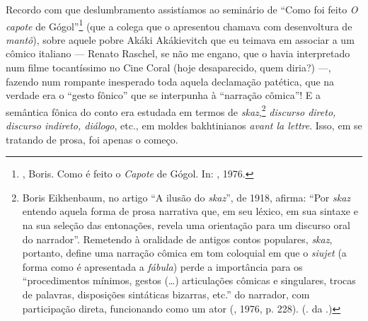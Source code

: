  Recordo com que deslumbramento assistíamos ao seminário de
``Como foi feito \emph{O capote} de Gógol''\footnote{, Boris.
 Como é feito o \emph{Capote} de Gógol. In: , 1976.} (que a colega que o
apresentou chamava com desenvoltura de \emph{mantô}), sobre aquele pobre Akáki
Akákievitch que eu teimava em associar a um cômico italiano --- Renato
Raschel, se não me engano, que o havia interpretado num filme
tocantíssimo no Cine Coral (hoje desaparecido, quem diria?) ---, fazendo num rompante inesperado toda aquela declamação patética, que na
verdade era o ``gesto fônico'' que se interpunha à ``narração cômica''!
E a semântica fônica do conto era estudada em termos de \emph{skaz},\footnote{Boris Eikhenbaum, no artigo ``A ilusão do \emph{skaz}'', de 1918, afirma: ``Por \emph{skaz} entendo aquela forma de prosa narrativa
 que, em seu léxico, em sua sintaxe e na sua seleção das entonações,
 revela uma orientação para um discurso oral do narrador''. Remetendo
 à oralidade de antigos contos populares, \emph{skaz}, portanto, 
define uma narração cômica em tom coloquial em que o \emph{siujet}
 (a forma como é apresentada a \emph{fábula})
 perde a importância para os ``procedimentos mínimos, gestos
 (\ldots{}) articulações cômicas e singulares, trocas de palavras,
 disposições sintáticas bizarras, etc.'' do narrador, com participação 
direta, funcionando como um ator (, 1976, p. 228).
 (. da .)}
\emph{discurso direto, discurso indireto, diálogo}, etc., em moldes bakhtinianos
\emph{avant la lettre}. Isso, em se tratando de prosa, foi apenas o começo.


